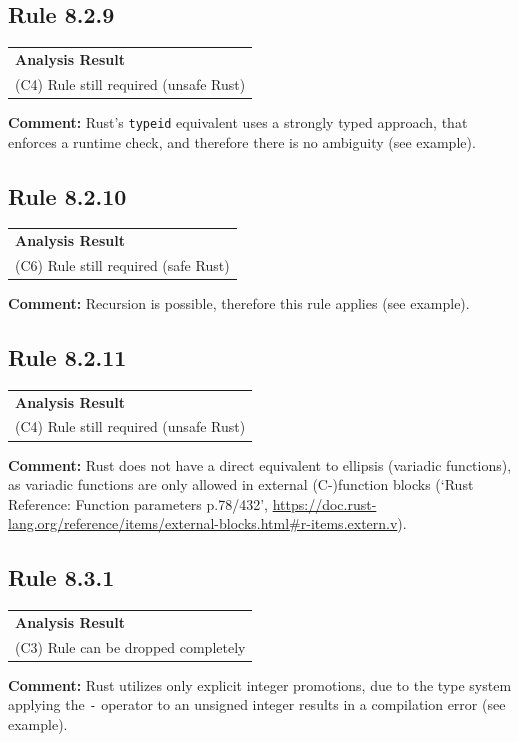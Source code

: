 \subsection*{Rule 8.2.9}
\begin{longtable}{p{13cm}}
\textbf{Analysis Result} \\
(C4) Rule still required (unsafe Rust) \\
\end{longtable}
\textbf{Comment:} Rust's \texttt{typeid} equivalent uses a strongly typed approach, that enforces a runtime check, and therefore there is no ambiguity (see example). \\


\subsection*{Rule 8.2.10}
\begin{longtable}{p{13cm}}
\textbf{Analysis Result} \\
(C6) Rule still required (safe Rust) \\
\end{longtable}
\textbf{Comment:} Recursion is possible, therefore this rule applies (see example). \\


\subsection*{Rule 8.2.11}
\begin{longtable}{p{13cm}}
\textbf{Analysis Result} \\
(C4) Rule still required (unsafe Rust) \\
\end{longtable}
\textbf{Comment:} Rust does not have a direct equivalent to ellipsis (variadic functions), as variadic functions are only allowed in external (C-)function blocks (`Rust Reference: Function parameters p.78/432', \url{https://doc.rust-lang.org/reference/items/external-blocks.html#r-items.extern.v}). \\
\subsection*{Rule 8.3.1}
\begin{longtable}{p{13cm}}
\textbf{Analysis Result} \\
(C3) Rule can be dropped completely \\
\end{longtable}
\textbf{Comment:} Rust utilizes only explicit integer promotions, due to the type system applying the \texttt{-} operator to an unsigned integer results in a compilation error (see example). \\


